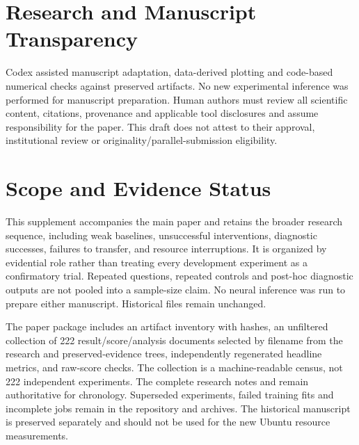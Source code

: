\documentclass[10pt]{article}
\begin{document}
\section*{Research and Manuscript Transparency}
Codex assisted manuscript adaptation, data-derived plotting and code-based numerical checks against preserved artifacts. No new experimental inference was performed for manuscript preparation. Human authors must review all scientific content, citations, provenance and applicable tool disclosures and assume responsibility for the paper. This draft does not attest to their approval, institutional review or originality/parallel-submission eligibility.


\clearpage\appendix\onecolumn
\section{Scope and Evidence Status}
This supplement accompanies the main paper and retains the broader research sequence, including weak baselines, unsuccessful interventions, diagnostic successes, failures to transfer, and resource interruptions. It is organized by evidential role rather than treating every development experiment as a confirmatory trial. Repeated questions, repeated controls and post-hoc diagnostic outputs are not pooled into a sample-size claim. No neural inference was run to prepare either manuscript. Historical files remain unchanged.

The paper package includes an artifact inventory with hashes, an unfiltered collection of 222 result/score/analysis documents selected by filename from the research and preserved-evidence trees, independently regenerated headline metrics, and raw-score checks. The collection is a machine-readable census, not 222 independent experiments. The complete research notes and  remain authoritative for chronology. Superseded experiments, failed training fits and incomplete jobs remain in the repository and archives. The historical manuscript is preserved separately and should not be used for the new Ubuntu resource measurements.
\end{document}
